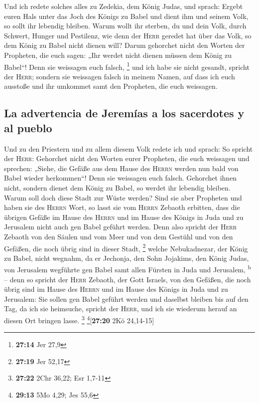  Und ich redete solches alles zu Zedekia, dem König
Judas, und sprach: Ergebt euren Hals unter das Joch des Königs zu Babel
und dient ihm und seinem Volk, so sollt ihr lebendig bleiben.
 Warum wollt ihr sterben, du und dein Volk, durch
Schwert, Hunger und Pestilenz, wie denn der \textsc{Herr} geredet hat
über das Volk, so dem König zu Babel nicht dienen will? 
Darum gehorchet nicht den Worten der Propheten, die euch sagen: „Ihr
werdet nicht dienen müssen dem König zu Babel``! Denn sie weissagen euch
falsch, \footnote{\textbf{27:14} Jer 27,9}  und ich habe
sie nicht gesandt, spricht der \textsc{Herr}; sondern sie weissagen
falsch in meinem Namen, auf dass ich euch ausstoße und ihr umkommet samt
den Propheten, die euch weissagen.

\hypertarget{la-advertencia-de-jeremuxedas-a-los-sacerdotes-y-al-pueblo}{%
\subsection{La advertencia de Jeremías a los sacerdotes y al
pueblo}\label{la-advertencia-de-jeremuxedas-a-los-sacerdotes-y-al-pueblo}}

 Und zu den Priestern und zu allem diesem Volk redete ich
und sprach: So spricht der \textsc{Herr}: Gehorchet nicht den Worten
eurer Propheten, die euch weissagen und sprechen: „Siehe, die Gefäße aus
dem Hause des \textsc{Herrn} werden nun bald von Babel wieder
herkommen``! Denn sie weissagen euch falsch.  Gehorchet
ihnen nicht, sondern dienet dem König zu Babel, so werdet ihr lebendig
bleiben. Warum soll doch diese Stadt zur Wüste werden? 
Sind sie aber Propheten und haben sie des \textsc{Herrn} Wort, so lasst
sie vom \textsc{Herrn} Zebaoth erbitten, dass die übrigen Gefäße im
Hause des \textsc{Herrn} und im Hause des Königs in Juda und zu
Jerusalem nicht auch gen Babel geführt werden.  Denn also
spricht der \textsc{Herr} Zebaoth von den Säulen und vom Meer und von
dem Gestühl und von den Gefäßen, die noch übrig sind in dieser Stadt,
\footnote{\textbf{27:19} Jer 52,17}  welche Nebukadnezar,
der König zu Babel, nicht wegnahm, da er Jechonja, den Sohn Jojakims,
den König Judas, von Jerusalem wegführte gen Babel samt allen Fürsten in
Juda und Jerusalem, \textsuperscript{b}  -- denn so
spricht der \textsc{Herr} Zebaoth, der Gott Israels, von den Gefäßen,
die noch übrig sind im Hause des \textsc{Herrn} und im Hause des Königs
in Juda und zu Jerusalem:  Sie sollen gen Babel geführt
werden und daselbst bleiben bis auf den Tag, da ich sie heimsuche,
spricht der \textsc{Herr}, und ich sie wiederum herauf an diesen Ort
bringen lasse. \footnote{\textbf{27:22} 2Chr 36,22; Esr 1,7-11}
\footnote{\textbf{29:13} 5Mo 4,29; Jes 55,6}{[}\textbf{27:20} 2Kö
24,14-15{]}

